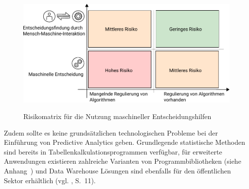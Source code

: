 \begin{figure}%
\centering
\caption{Risikomatrix für die Nutzung maschineller Entscheidungshilfen}
\includegraphics[scale=1.0]{Grafiken/Risk_Matrix_Ink.pdf} 
\label{pic:Risiko_Matrix}
\end{figure}

Zudem sollte es keine grundsätzlichen technologischen Probleme bei der Einführung von
Predictive Analytics geben. Grundlegende statistische Methoden sind bereits in
Tabellenkalkulationsprogrammen verfügbar, für erweiterte Anwendungen existieren zahlreiche
Varianten von Programmbibliotheken (siehe Anhang~\xcom) und Data Warehouse Lösungen sind
ebenfalls für den öffentlichen Sektor erhältlich (vgl. \cite{IT_Novum}, S.~11).




